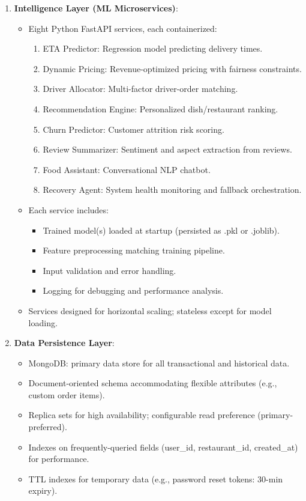 \documentclass[12pt,a4paper]{report}
\begin{document}
\begin{itemize}
\begin{enumerate}
    \item \textbf{Intelligence Layer (ML Microservices)}:
    \begin{itemize}
        \item Eight Python FastAPI services, each containerized:
        \begin{enumerate}
            \item ETA Predictor: Regression model predicting delivery times.
            \item Dynamic Pricing: Revenue-optimized pricing with fairness constraints.
            \item Driver Allocator: Multi-factor driver-order matching.
            \item Recommendation Engine: Personalized dish/restaurant ranking.
            \item Churn Predictor: Customer attrition risk scoring.
            \item Review Summarizer: Sentiment and aspect extraction from reviews.
            \item Food Assistant: Conversational NLP chatbot.
            \item Recovery Agent: System health monitoring and fallback orchestration.
        \end{enumerate}
        \item Each service includes:
        \begin{itemize}
            \item Trained model(s) loaded at startup (persisted as .pkl or .joblib).
            \item Feature preprocessing matching training pipeline.
            \item Input validation and error handling.
            \item Logging for debugging and performance analysis.
        \end{itemize}
        \item Services designed for horizontal scaling; stateless except for model loading.
    \end{itemize}
    
    \item \textbf{Data Persistence Layer}:
    \begin{itemize}
        \item MongoDB: primary data store for all transactional and historical data.
        \item Document-oriented schema accommodating flexible attributes (e.g., custom order items).
        \item Replica sets for high availability; configurable read preference (primary-preferred).
        \item Indexes on frequently-queried fields (user_id, restaurant_id, created_at) for performance.
        \item TTL indexes for temporary data (e.g., password reset tokens: 30-min expiry).
    \end{itemize}
    

\end{enumerate}
\end{itemize}
\end{document}
